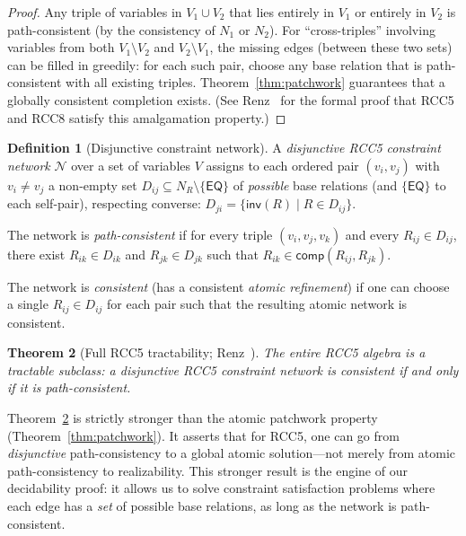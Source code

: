 \documentclass[a4paper,11pt]{article}
\newtheorem{theorem}{Theorem}[section]
\theoremstyle{definition}
\newtheorem{definition}[theorem]{Definition}
\newcommand{\NR}{\ensuremath{N_R}}
\newcommand{\EQ}{\ensuremath{\mathsf{EQ}}}
\newcommand{\inv}{\ensuremath{\mathsf{inv}}}
\newcommand{\comp}{\ensuremath{\mathsf{comp}}}
\begin{document}
\begin{proof}
Any triple of variables in $V_1 \cup V_2$ that lies entirely in $V_1$
or entirely in $V_2$ is path-consistent (by the consistency of $N_1$
or $N_2$).  For ``cross-triples'' involving variables from both $V_1
\setminus V_2$ and $V_2 \setminus V_1$, the missing edges (between
these two sets) can be filled in greedily: for each such pair, choose
any base relation that is path-consistent with all existing triples.
Theorem~\ref{thm:patchwork} guarantees that a globally consistent
completion exists.  (See Renz~\cite{Renz1999} for the formal proof
that RCC5 and RCC8 satisfy this amalgamation property.)
\end{proof}

\begin{definition}[Disjunctive constraint network]
\label{def:disjunctive}
A \emph{disjunctive RCC5 constraint network} $\mathcal{N}$ over a set
of variables $V$ assigns to each ordered pair $(v_i, v_j)$ with $v_i
\neq v_j$ a non-empty set $D_{ij} \subseteq \NR \setminus \{\EQ\}$ of
\emph{possible} base relations (and $\{\EQ\}$ to each self-pair),
respecting converse: $D_{ji} = \{\inv(R) \mid R \in D_{ij}\}$.

The network is \emph{path-consistent} if for every triple $(v_i, v_j,
v_k)$ and every $R_{ij} \in D_{ij}$, there exist $R_{ik} \in D_{ik}$
and $R_{jk} \in D_{jk}$ such that $R_{ik} \in \comp(R_{ij}, R_{jk})$.

The network is \emph{consistent} (has a consistent \emph{atomic
refinement}) if one can choose a single $R_{ij} \in D_{ij}$ for each
pair such that the resulting atomic network is consistent.
\end{definition}

\begin{theorem}[Full RCC5 tractability; Renz~\cite{Renz1999}]
\label{thm:rcc5-tract}
The entire RCC5 algebra is a tractable subclass: a disjunctive RCC5
constraint network is consistent if and only if it is
path-consistent.
\end{theorem}

\noindent
Theorem~\ref{thm:rcc5-tract} is strictly stronger than the atomic
patchwork property (Theorem~\ref{thm:patchwork}).  It asserts that for
RCC5, one can go from \emph{disjunctive} path-consistency to a global
atomic solution---not merely from atomic path-consistency to
realizability.  This stronger result is the engine of our decidability
proof: it allows us to solve constraint satisfaction problems where
each edge has a \emph{set} of possible base relations, as long as the
network is path-consistent.
\end{document}
